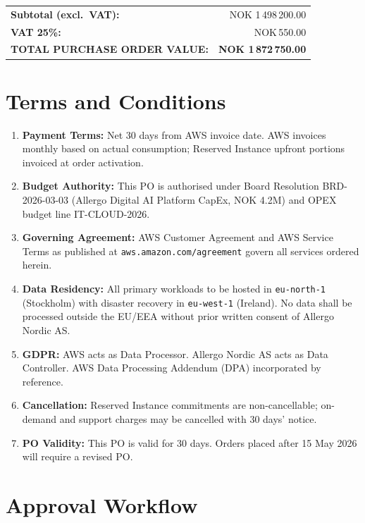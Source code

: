 \documentclass[a4paper,11pt]{article}
\begin{document}
\vspace{10pt}

\hfill
\begin{tabular}{lr}
  \toprule
  \textbf{Subtotal (excl.\ VAT):} & NOK 1\,498\,200.00 \\
  \textbf{VAT 25\%:}              & NOK\;\;\; 374\,550.00 \\
  \midrule
  \rowcolor{brand}
  \color{white}\textbf{TOTAL PURCHASE ORDER VALUE:} &
  \color{white}\textbf{NOK 1\,872\,750.00} \\
  \bottomrule
\end{tabular}

\section{Terms and Conditions}

\begin{enumerate}[leftmargin=*, label=\arabic{*}.]
  \item \textbf{Payment Terms:} Net 30 days from AWS invoice date. AWS invoices monthly based on
    actual consumption; Reserved Instance upfront portions invoiced at order activation.
  \item \textbf{Budget Authority:} This PO is authorised under Board Resolution BRD-2026-03-03
    (Allergo Digital AI Platform CapEx, NOK 4.2M) and OPEX budget line IT-CLOUD-2026.
  \item \textbf{Governing Agreement:} AWS Customer Agreement and AWS Service Terms as published at
    \texttt{aws.amazon.com/agreement} govern all services ordered herein.
  \item \textbf{Data Residency:} All primary workloads to be hosted in \texttt{eu-north-1}
    (Stockholm) with disaster recovery in \texttt{eu-west-1} (Ireland). No data shall be
    processed outside the EU/EEA without prior written consent of Allergo Nordic AS.
  \item \textbf{GDPR:} AWS acts as Data Processor. Allergo Nordic AS acts as Data Controller.
    AWS Data Processing Addendum (DPA) incorporated by reference.
  \item \textbf{Cancellation:} Reserved Instance commitments are non-cancellable; on-demand and
    support charges may be cancelled with 30 days' notice.
  \item \textbf{PO Validity:} This PO is valid for 30 days. Orders placed after 15 May 2026 will
    require a revised PO.
\end{enumerate}

\section{Approval Workflow}
\end{document}

